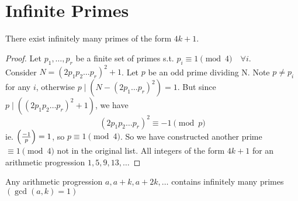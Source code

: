 \section{Infinite Primes}
    \begin{theorem}
        There exist infinitely many primes of the form $4k+1$. 
        \begin{proof}
            Let $p_1,\dots,p_r$ be a finite set of primes s.t.
            $p_i\equiv 1\pmod{4}\quad\forall i$. \\
            Consider $N=(2p_1p_2\dots p_r)^2+1$.
            Let $p$ be an odd prime dividing N. Note $p\ne p_i$ 
            for any $i$, otherwise $p\mid(N-(2p_1\dots p_r)^2)=1$.
            But since $p\mid((2p_1p_2\dots p_r)^2+1)$, we have
            \[
                (2p_1p_2\dots p_r)^2\equiv -1\pmod{p}
            \]
            ie. $\left( \frac{-1}{p} \right) =1$, so $p\equiv 1\pmod{4}$.
            So we have constructed another prime $\equiv 1\pmod{4}$
            not in the original list.
            All integers of the form $4k+1$ for an arithmetic progression
            $1,5,9,13,\dots$

        \end{proof}
    \end{theorem}

    \begin{theorem} [Dirichlet]
        Any arithmetic progression $a,a+k,a+2k,\dots$ contains
        infinitely many primes $(\gcd(a,k)=1)$
    \end{theorem}


